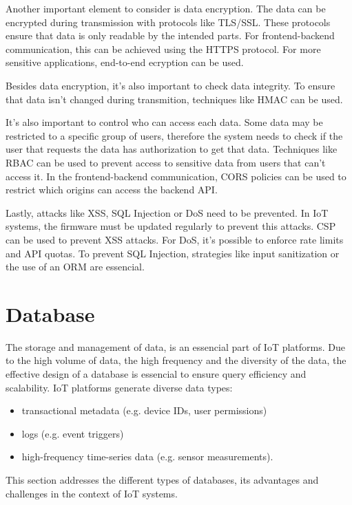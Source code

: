 Another important element to consider is data encryption.
The data can be encrypted during transmission with protocols like \gls{TLS}/\gls{SSL}.
These protocols ensure that data is only readable by the intended parts.
For frontend-backend communication, this can be achieved using the \gls{HTTPS}
protocol.
For more sensitive applications, end-to-end ecryption can be used.

Besides data encryption, it's also important to check data integrity.
To ensure that data isn't changed during transmition, techniques like
\gls{HMAC} can be used.

It's also important to control who can access each data.
Some data may be restricted to a specific group of users, therefore the
system needs to check if the user that requests the data has
authorization to get that data. Techniques like \gls{RBAC} can be used to
prevent access to sensitive data from users that can't access it.
In the frontend-backend communication, \gls{CORS} policies can be used to
restrict which origins can access the backend \gls{API}.

Lastly, attacks like \gls{XSS}, \gls{SQL} Injection or \gls{DoS} need to be prevented.
In \gls{IoT} systems, the firmware must be updated regularly to prevent this
attacks.
\gls{CSP} can be used to prevent \gls{XSS} attacks. For \gls{DoS}, it's possible to enforce
rate limits and \gls{API} quotas. To prevent \gls{SQL} Injection, strategies like
input sanitization or the use of an \gls{ORM} are essencial.

\section{Database}
The storage and management of data, is an essencial part of \gls{IoT} platforms.
Due to the high volume of data, the high frequency and the diversity of the
data, the effective design of a database is essencial to ensure query efficiency
and scalability.
\gls{IoT} platforms generate diverse data types:
\begin{itemize}
	\item transactional metadata (e.g. device \gls{ID}s, user permissions)
	\item logs (e.g. event triggers)
	\item high-frequency time-series data (e.g. sensor measurements).
\end{itemize}

This section addresses the different types of databases, its advantages and
challenges in the context of \gls{IoT} systems.

